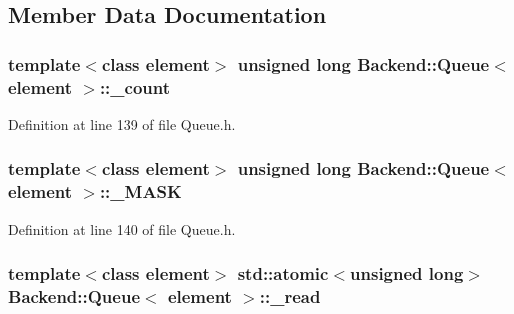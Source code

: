 \subsection{Member Data Documentation}
\hypertarget{class_backend_1_1_queue_ab49d17e24dc0f8a2e5e44c182c240249}{
\subsubsection[{\+\_\+count}]{\setlength{\rightskip}{0pt plus 5cm}template$<$class element$>$ unsigned long {\bf Backend\+::\+Queue}$<$ element $>$\+::\+\_\+count\hspace{0.3cm}{\ttfamily [protected]}}}\label{class_backend_1_1_queue_ab49d17e24dc0f8a2e5e44c182c240249}


Definition at line 139 of file Queue.\+h.

\hypertarget{class_backend_1_1_queue_ab665bcab528d6bad6c4faab1ae0fc1b4}{
\subsubsection[{\+\_\+\+M\+A\+S\+K}]{\setlength{\rightskip}{0pt plus 5cm}template$<$class element$>$ unsigned long {\bf Backend\+::\+Queue}$<$ element $>$\+::\+\_\+\+M\+A\+S\+K\hspace{0.3cm}{\ttfamily [protected]}}}\label{class_backend_1_1_queue_ab665bcab528d6bad6c4faab1ae0fc1b4}


Definition at line 140 of file Queue.\+h.

\hypertarget{class_backend_1_1_queue_a508eb8c4fedb73fc4abbf26353bdfd82}{
\subsubsection[{\+\_\+read}]{\setlength{\rightskip}{0pt plus 5cm}template$<$class element$>$ std\+::atomic$<$unsigned long$>$ {\bf Backend\+::\+Queue}$<$ element $>$\+::\+\_\+read\hspace{0.3cm}{\ttfamily [protected]}}}\label{class_backend_1_1_queue_a508eb8c4fedb73fc4abbf26353bdfd82}


